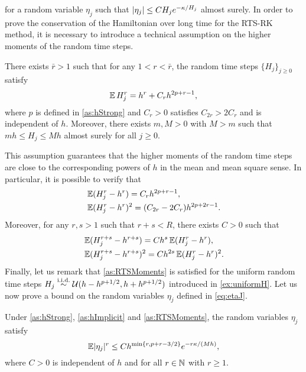 \documentclass[10pt]{article}
\begin{document}
for a random variable $\eta_j$ such that $\lvert\eta_j\rvert \leq C H_j e^{-\kappa / H_j}$ almost surely. In order to prove the conservation of the Hamiltonian over long time for the RTS-RK method, it is necessary to introduce a technical assumption on the higher moments of the random time steps.
\begin{assumption}\label{as:RTSMoments} There exists $\bar r > 1$ such that for any $1 < r < \bar r$, the random time steps $\{H_j\}_{j\geq 0}$ satisfy
	\begin{equation}
	\operatorname{\mathbb{E}} H_j^r = h^r + C_rh^{2p+r-1},
	\end{equation}
	where $p$ is defined in \cref{as:hStrong} and $C_r > 0$ satisfies $C_{2r} > 2C_r$ and is independent of $h$. Moreover, there exists $m, M > 0$ with $M > m$ such that $mh \leq H_j \leq Mh$ almost surely for all $j \geq 0$.
\end{assumption}
This assumption guarantees that the higher moments of the random time steps are close to the corresponding powers of $h$ in the mean and mean square sense. In particular, it is possible to verify that
\begin{equation}
\begin{aligned}
&\operatorname{\mathbb{E}}(H_j^r - h^r) = C_r h^{2p+r-1},\\
&\operatorname{\mathbb{E}}(H_j^r - h^r)^2 = (C_{2r} - 2C_r) h^{2p+2r-1}.
\end{aligned}
\end{equation}
Moreover, for any $r, s > 1$ such that $r + s < R$, there exists $C > 0$ such that
\begin{equation}\label{eq:higherHigherMoments}
\begin{aligned}
&\operatorname{\mathbb{E}}(H_j^{r+s} - h^{r+s}) = C h^s \operatorname{\mathbb{E}}(H_j^r - h^r),\\
&\operatorname{\mathbb{E}}(H_j^{r+s} - h^{r+s})^2 = C h^{2s} \operatorname{\mathbb{E}}(H_j^r - h^r)^2.
\end{aligned}
\end{equation}
Finally, let us remark that \cref{as:RTSMoments} is satisfied for the uniform random time steps $H_j \stackrel{\text{i.i.d.}}{\sim} \mathcal U(h-h^{p+1/2}, h+h^{p+1/2})$ introduced in \cref{ex:uniformH}. Let us now prove a bound on the random variables $\eta_j$ defined in \eqref{eq:etaJ}.
	\begin{lemma}\label{lem:BoundEtaJ} Under \cref{as:hStrong}, \cref{as:hImplicit} and \cref{as:RTSMoments}, the random variables $\eta_j$ satisfy
		\begin{equation}
		\operatorname{\mathbb{E}} \lvert\eta_j\rvert^r \leq C h^{\min\{r, p+r-3/2\}} e^{-r\kappa/(Mh)}, 
		\end{equation}
		where $C > 0$ is independent of $h$ and for all $r \in \mathbb{N}$ with $r \geq 1$.
	\end{lemma}
\end{document}
